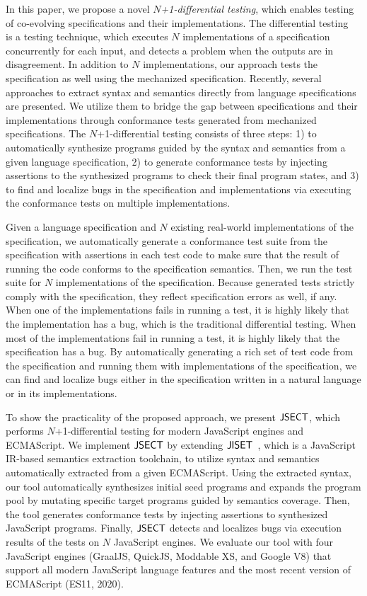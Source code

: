 In this paper, we propose a novel \textit{$N$+1-differential testing}, which
enables testing of co-evolving specifications and their implementations.  The
differential testing~\cite{diff-test} is a testing technique, which executes $N$
implementations of a specification concurrently for each input, and detects a
problem when the outputs are in disagreement.  In addition to $N$
implementations, our approach tests the specification as well using the
mechanized specification.  Recently, several approaches to extract syntax and
semantics directly from language specifications are presented\cite{jiset,
extract-x86, extract-arm}.  We utilize them to bridge the gap between
specifications and their implementations through conformance tests generated
from mechanized specifications.  The $N$+1-differential testing consists of
three steps: 1) to automatically synthesize programs guided by the syntax and
semantics from a given language specification, 2) to generate conformance tests
by injecting assertions to the synthesized programs to check their final program
states, and 3) to find and localize bugs in the specification and
implementations via executing the conformance tests on multiple implementations.

Given a language specification and $N$ existing real-world
implementations of the specification, we
automatically generate a conformance test suite from the specification with
assertions in each test code to make sure that the result of running the code
conforms to the specification semantics.  Then, we run the test suite for $N$
implementations of the specification.  Because generated tests strictly comply
with the specification, they reflect specification errors as well, if any.  When
one of the implementations fails in running a test, it is highly likely that the
implementation has a bug, which is the traditional differential testing.  When
most of the implementations fail in running a test, it is highly likely that
the specification has a bug.  By automatically generating a rich set of test
code from the specification and running them with implementations of the
specification, we can find and localize bugs either in the specification written
in a natural language or in its implementations.

To show the practicality of the proposed approach, we present $\text{\sf JSECT}$, which
performs $N$+1-differential testing for modern JavaScript engines and ECMAScript.
We implement $\text{\sf JSECT}$ by extending $\text{\sf JISET}$~\cite{jiset}, which is a JavaScript
IR-based semantics extraction toolchain, to utilize syntax and semantics
automatically extracted from a given ECMAScript.  Using the extracted syntax,
our tool automatically synthesizes initial seed programs and expands the program
pool by mutating specific target programs guided by semantics coverage.  Then,
the tool generates conformance tests by injecting assertions to synthesized
JavaScript programs.  Finally, $\text{\sf JSECT}$ detects and localizes bugs via execution
results of the tests on $N$ JavaScript engines.  We evaluate our tool with four
JavaScript engines (GraalJS\cite{graaljs}, QuickJS\cite{qjs}, Moddable
XS\cite{xs}, and Google V8\cite{v8}) that support all modern JavaScript language
features and the most recent version of ECMAScript (ES11, 2020).

